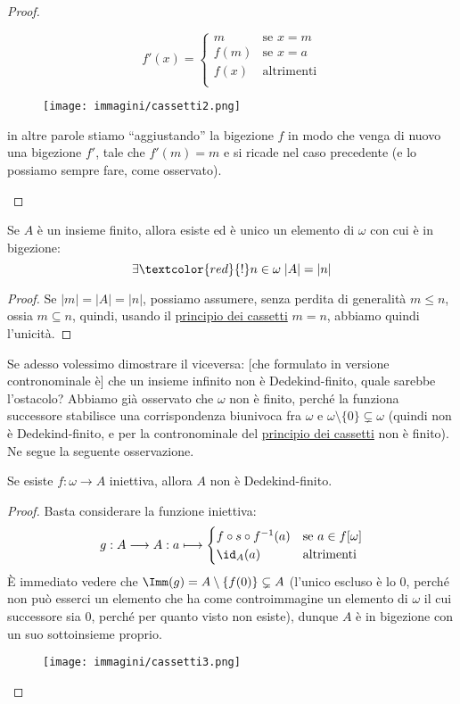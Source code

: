 \documentclass[11pt]{scrartcl}
\begin{document}
\begin{proof}
\begin{itemize}
		\[ f'(x) = \begin{cases}
			m &\text{se $x = m$} \\
			f(m) &\text{se $x = a$} \\
			f(x) &\text{altrimenti} \\
		\end{cases}
			\]
			\begin{figure}[H]
				\centering
				\texttt{[image: immagini/cassetti2.png]}
			\end{figure}
		in altre parole stiamo ``aggiustando'' la bigezione $f$ in modo che venga di nuovo una bigezione $f'$, tale che $f'(m) = m$ e si ricade nel caso precedente (e lo possiamo sempre fare, come osservato).
	\end{itemize}
\end{proof}

\begin{corollary}
	Se $A$ è un insieme finito, allora esiste ed è unico un elemento di $\omega$ con cui è in bigezione:
	\[ \exists \textcolor{red}{!} n \in \omega \; |A| = |n|
		\]
\end{corollary}

\begin{proof}
	Se $|m| = |A| = |n|$, possiamo assumere, senza perdita di generalità $m \leq n$, ossia $m \subseteq n$, quindi, usando il \hyperref[cassetti]{principio dei cassetti} $m = n$, abbiamo quindi l'unicità.
\end{proof}

Se adesso volessimo dimostrare il viceversa: [che formulato in versione contronominale è] che un insieme infinito non è Dedekind-finito, quale sarebbe l'ostacolo? Abbiamo già osservato che $\omega$ non è finito, perché la funziona successore 
stabilisce una corrispondenza biunivoca fra $\omega$ e $\omega \setminus\{0\} \subsetneq \omega$ (quindi non è Dedekind-finito, e per la contronominale del \hyperref[cassetti]{principio dei cassetti} non è finito). Ne segue la seguente osservazione.

\begin{remark}
	Se esiste $f : \omega \rightarrow A$ iniettiva, allora $A$ non è Dedekind-finito.
\end{remark}

\begin{proof}
	Basta considerare la funzione iniettiva:
	\[ g : A \longrightarrow A : a \longmapsto \begin{cases}
		f \circ s \circ f^{-1}(a) &\text{se $a \in f[\omega]$} \\
		\id_A(a) &\text{altrimenti}
	\end{cases}
		\]
	È immediato vedere che $\Imm(g) = A \setminus \{f(0)\} \subsetneq A$ (l'unico escluso è lo 0, perché non può esserci un elemento che ha come controimmagine un elemento di $\omega$ il cui successore sia 0, perché per quanto visto non esiste), dunque $A$ è in bigezione con un suo sottoinsieme proprio.
	\begin{figure}[H]
		\centering
		\texttt{[image: immagini/cassetti3.png]}
	\end{figure}
\end{proof}
\end{document}
